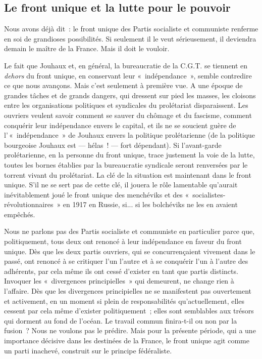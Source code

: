 \documentclass[french,twoside]{book} %
\begin{document}
\subsection[{Le front unique et la lutte pour le pouvoir}]{Le front unique et la lutte pour le pouvoir}
\noindent Nous avons déjà dit : le front unique des Partis socialiste et communiste renferme en soi de grandioses possibilités. Si seulement il le veut sérieusement, il deviendra demain le maître de la France. Mais il doit le vouloir.\par
Le fait que Jouhaux et, en général, la bureaucratie de la C.G.T. se tiennent en \emph{dehors} du front unique, en conservant leur « indépendance », semble contredire ce que nous avançons. Mais c’est seulement à première vue. A une époque de grandes tâches et de grands dangers, qui dressent sur pied les masses, les cloisons entre les organisations politiques et syndicales du prolétariat disparaissent. Les ouvriers veulent savoir comment se sauver du chômage et du fascisme, comment conquérir leur indépendance envers le capital, et ils ne se soucient guère de l’ « indépendance » de Jouhaux envers la politique prolétarienne (de la politique bourgeoise Jouhaux est — hélas ! — fort dépendant). Si l’avant-garde prolétarienne, en la personne du front unique, trace justement la voie de la lutte, toutes les bornes établies par la bureaucratie syndicale seront renversées par le torrent vivant du prolétariat. La clé de la situation est maintenant dans le front unique. S’il  ne se sert pas de cette clé, il jouera le rôle lamentable qu’aurait inévitablement joué le front unique des menchéviks et des « socialistes-révolutionnaires » en 1917 en Russie, si... si les bolchéviks ne les en avaient empêchés.\par
Nous ne parlons pas des Partis socialiste et communiste en particulier parce que, politiquement, tous deux ont renoncé à leur indépendance en faveur du front unique. Dès que les deux partis ouvriers, qui se concurrençaient vivement dans le passé, ont renoncé à se critiquer l’un l’autre et à se conquérir l’un à l’autre des adhérents, par cela même ils ont cessé d’exister en tant que partis distincts. Invoquer les « divergences principielles » qui demeurent, ne change rien à l’affaire. Dès que les divergences principielles ne se manifestent pas ouvertement et activement, en un moment si plein de responsabilités qu’actuellement, elles cessent par cela même d’exister politiquement ; elles sont semblables aux trésors qui dorment au fond de l’océan. Le travail commun finira-t-il ou non par la fusion ? Nous ne voulons pas le prédire. Mais pour la présente période, qui a une importance décisive dans les destinées de la France, le front unique agit comme un parti inachevé, construit sur le principe fédéraliste.\par
\end{document}
